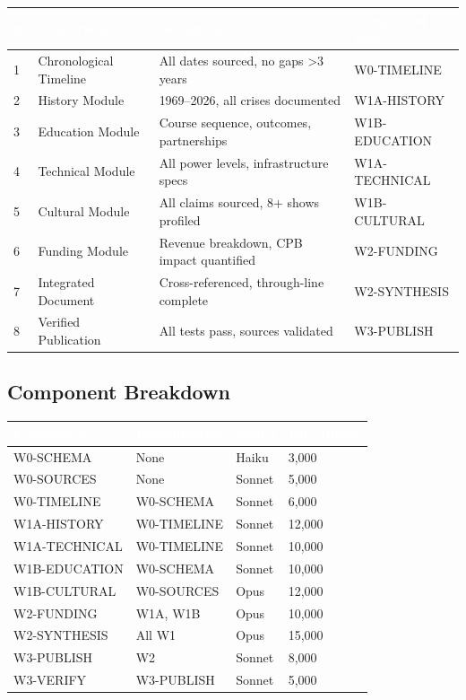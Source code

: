 \documentclass[11pt,letterpaper]{article}
\newcommand{\tableheader}[1]{\textbf{\sffamily\textcolor{white}{#1}}}
\begin{document}
\begin{center}
\begin{tabularx}{\textwidth}{C{0.5cm}L{3.5cm}XL{3cm}}
\toprule
{}
\tableheader{\#} & \tableheader{Deliverable} & \tableheader{Acceptance Criteria} & \tableheader{Component Spec} \\
 & Chronological Timeline & All dates sourced, no gaps >3 years & W0-TIMELINE \\
2 & History Module & 1969--2026, all crises documented & W1A-HISTORY \\
3 & Education Module & Course sequence, outcomes, partnerships & W1B-EDUCATION \\
4 & Technical Module & All power levels, infrastructure specs & W1A-TECHNICAL \\
5 & Cultural Module & All claims sourced, 8+ shows profiled & W1B-CULTURAL \\
6 & Funding Module & Revenue breakdown, CPB impact quantified & W2-FUNDING \\
7 & Integrated Document & Cross-referenced, through-line complete & W2-SYNTHESIS \\
8 & Verified Publication & All tests pass, sources validated & W3-PUBLISH \\
\bottomrule
\end{tabularx}
\end{center}

\subsection{Component Breakdown}

\begin{center}
\begin{tabularx}{\textwidth}{L{3cm}L{2.5cm}C{1.5cm}C{2cm}}
\toprule
{}
\tableheader{Component} & \tableheader{Dependencies} & \tableheader{Model} & \tableheader{Est. Tokens} \\
\midrule
W0-SCHEMA & None & Haiku & 3,000 \\
W0-SOURCES & None & Sonnet & 5,000 \\
W0-TIMELINE & W0-SCHEMA & Sonnet & 6,000 \\
W1A-HISTORY & W0-TIMELINE & Sonnet & 12,000 \\
W1A-TECHNICAL & W0-TIMELINE & Sonnet & 10,000 \\
W1B-EDUCATION & W0-SCHEMA & Sonnet & 10,000 \\
W1B-CULTURAL & W0-SOURCES & Opus & 12,000 \\
W2-FUNDING & W1A, W1B & Opus & 10,000 \\
W2-SYNTHESIS & All W1 & Opus & 15,000 \\
W3-PUBLISH & W2 & Sonnet & 8,000 \\
W3-VERIFY & W3-PUBLISH & Sonnet & 5,000 \\
\bottomrule
\end{tabularx}
\end{center}
\end{document}
